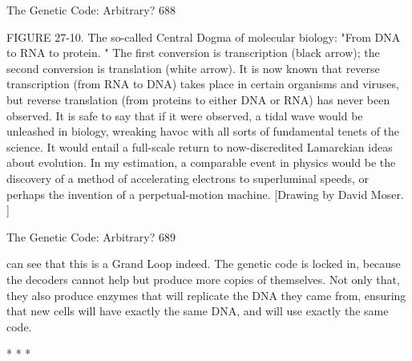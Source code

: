 The Genetic Code: Arbitrary?                                                        688

FIGURE 27-10. The so-called Central Dogma of molecular biology: "From DNA to
RNA to protein. " The first conversion is transcription (black arrow); the second
conversion is translation (white arrow). It is now known that reverse transcription
(from RNA to DNA) takes place in certain organisms and viruses, but reverse
translation (from proteins to either DNA or RNA) has never been observed. It is safe
to say that if it were observed, a tidal wave would be unleashed in biology, wreaking
havoc with all sorts of fundamental tenets of the science. It would entail a full-scale
return to now-discredited Lamarckian ideas about evolution. In my estimation, a
comparable event in physics would be the discovery of a method of accelerating
electrons to superluminal speeds, or perhaps the invention of a perpetual-motion
machine. [Drawing by David Moser. ]




The Genetic Code: Arbitrary?                                                       689

can see that this is a Grand Loop indeed. The genetic code is locked in, because the
decoders cannot help but produce more copies of themselves. Not only that, they also
produce enzymes that will replicate the DNA they came from, ensuring that new cells
will have exactly the same DNA, and will use exactly the same code.

                                        *   *   *

